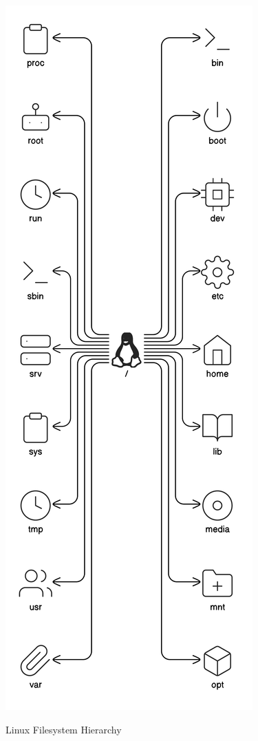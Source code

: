 \begin{marginfigure}
	\includegraphics[width=0.9\marginparwidth]{images/pdf/linuxfs.pdf}
	\caption[Linux Filesystem Hierarchy]{Linux Filesystem Hierarchy}
\end{marginfigure}

